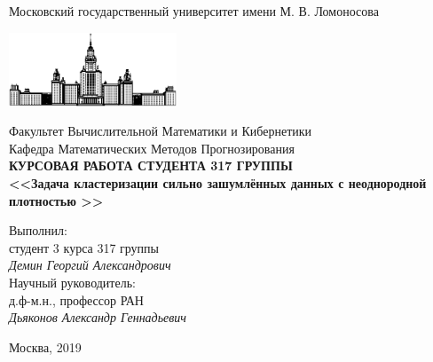\documentclass[12pt,fleqn]{article}
\begin{document}
\begin{titlepage}
\begin{center}
    Московский государственный университет имени М. В. Ломоносова

    \bigskip
    \includegraphics[width=50mm]{msu.eps}

    \bigskip
    Факультет Вычислительной Математики и Кибернетики\\
    Кафедра Математических Методов Прогнозирования\\[10mm]

    \textsf{\large\bfseries
        КУРСОВАЯ РАБОТА СТУДЕНТА 317 ГРУППЫ\\[10mm]
        <<Задача кластеризации сильно зашумлённых данных с неоднородной плотностью >>
    }\\[10mm]

    \begin{flushright}
        \parbox{0.5\textwidth}{
            Выполнил:\\
            студент 3 курса 317 группы\\
            \emph{Демин Георгий Александрович}\\[5mm]
            Научный руководитель:\\
            д.ф-м.н., профессор РАН\\
            \emph{Дьяконов Александр Геннадьевич}
        }
    \end{flushright}
    
    

    
    \vspace{\fill}
    Москва, 2019
\end{center}
\end{titlepage}
\end{document}
